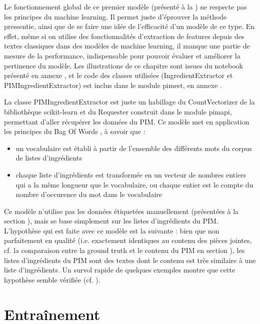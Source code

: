             Le fonctionnement global de ce premier modèle (présenté à la ) ne respecte pas les principes du machine learning.
            Il permet juste d'éprouver la méthode pressentie, ainsi que de se faire une idée de l'efficacité d'un modèle de ce type.
            En effet, même si on utilise des fonctionnalités d'extraction de features depuis des textes classiques dans des modèles de machine learning, il manque une partie de mesure de la performance, indispensable pour pouvoir évaluer et améliorer la pertinence du modèle.
            Les illustrations de ce chapitre sont issues du notebook présenté en annexe , et le code des classes utilisées (IngredientExtractor et PIMIngredientExtractor) est inclus dans le module pimest, en annexe .

            La classe PIMIngredientExtractor est juste un habillage du CountVectorizer de la bibliothèque scikit-learn et du Requester construit dans le module pimapi, permettant d'aller récupérer les données du PIM.
            Ce modèle met en application les principes du \og Bag Of Words \fg \cite{bag_of_words_wiki}, à savoir que :
            \begin{itemize}
                \item un vocabulaire est établi à partir de l'ensemble des différents mots du corpus de listes d'ingrédients
                \item chaque liste d'ingrédients est transformée en un vecteur de nombres entiers qui a la même longueur que le vocabulaire, ou chaque entier est le compte du nombre d'occurence du mot dans le vocabulaire
            \end{itemize}

            Ce modèle n'utilise pas les données étiquetées manuellement (présentées à la section ), mais se base simplement sur les listes d'ingrédients du PIM.
            L'hypothèse qui est faite avec ce modèle est la suivante : bien que non parfaitement en qualité (i.e. exactement identiques au contenu des pièces jointes, cf. la comparaison entre la ground truth et le contenu du PIM en section ), les listes d'ingrédients du PIM sont des textes dont le contenu est très similaire à une liste d'ingrédients.
            Un survol rapide de quelques exemples montre que cette hypothèse semble vérifiée (cf. ).

        \section{Entraînement}

